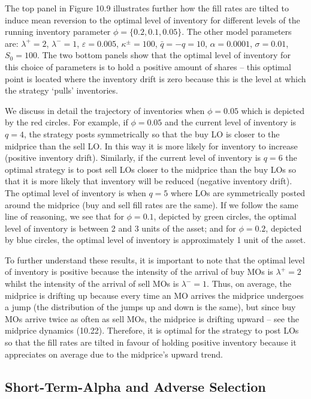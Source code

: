 \documentclass[11pt, a4paper]{book}
\begin{document}
	The top panel in Figure 10.9 illustrates further how the fill rates are tilted to induce mean reversion to the optimal level of inventory for different levels of the running inventory parameter $\phi = \{0.2, 0.1, 0.05\}$. The other model parameters are: $\lambda^+ = 2$, $\lambda^- = 1$, $\varepsilon = 0.005$, $\kappa^\pm = 100$, $\bar{q} = -q = 10$, $\alpha = 0.0001$, $\sigma = 0.01$, $S_0 = 100$. The two bottom panels show that the optimal level of inventory for this choice of parameters is to hold a positive amount of shares – this optimal point is located where the inventory drift is zero because this is the level at which the strategy `pulls' inventories.
	
	We discuss in detail the trajectory of inventories when $\phi = 0.05$ which is depicted by the red circles. For example, if $\phi = 0.05$ and the current level of inventory is $q = 4$, the strategy posts symmetrically so that the buy LO is closer to the midprice than the sell LO. In this way it is more likely for inventory to increase (positive inventory drift). Similarly, if the current level of inventory is $q = 6$ the optimal strategy is to post sell LOs closer to the midprice than the buy LOs so that it is more likely that inventory will be reduced (negative inventory drift). The optimal level of inventory is when $q = 5$ where LOs are symmetrically posted around the midprice (buy and sell fill rates are the same). If we follow the same line of reasoning, we see that for $\phi = 0.1$, depicted by green circles, the optimal level of inventory is between 2 and 3 units of the asset; and for $\phi = 0.2$, depicted by blue circles, the optimal level of inventory is approximately 1 unit of the asset.
	
	To further understand these results, it is important to note that the optimal level of inventory is positive because the intensity of the arrival of buy MOs is $\lambda^+ = 2$ whilst the intensity of the arrival of sell MOs is $\lambda^- = 1$. Thus, on average, the midprice is drifting up because every time an MO arrives the midprice undergoes a jump (the distribution of the jumps up and down is the same), but since buy MOs arrive twice as often as sell MOs, the midprice is drifting upward – see the midprice dynamics (10.22). Therefore, it is optimal for the strategy to post LOs so that the fill rates are tilted in favour of holding positive inventory because it appreciates on average due to the midprice's upward trend.
	
	\subsection{Short-Term-Alpha and Adverse Selection} \label{sec:10.4.2}
	
\end{document}
